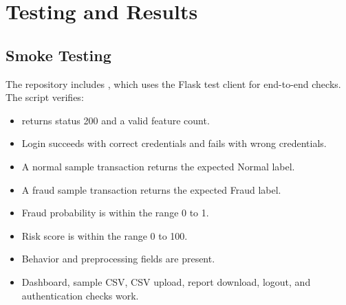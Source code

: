 \documentclass[12pt,a4paper]{report}
\begin{document}
\chapter{Testing and Results}

\section{Smoke Testing}
The repository includes , which uses the Flask test client for end-to-end checks. The script verifies:
\begin{itemize}
    \item {} returns status 200 and a valid feature count.
    \item Login succeeds with correct credentials and fails with wrong credentials.
    \item A normal sample transaction returns the expected Normal label.
    \item A fraud sample transaction returns the expected Fraud label.
    \item Fraud probability is within the range 0 to 1.
    \item Risk score is within the range 0 to 100.
    \item Behavior and preprocessing fields are present.
    \item Dashboard, sample CSV, CSV upload, report download, logout, and authentication checks work.
\end{itemize}
\end{document}
